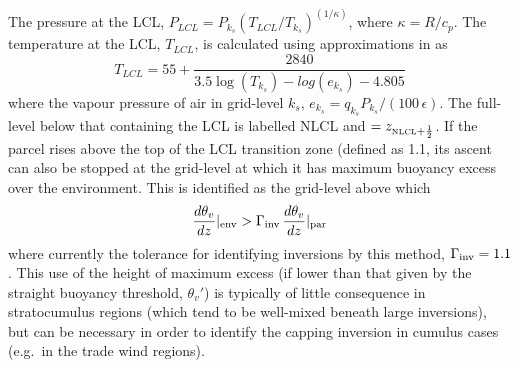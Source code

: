 \documentclass{UMDP_article}
\begin{document}
The pressure at the LCL, $P_{LCL}=P_{k_s}
(T_{LCL}/T_{k_s})^{(1/\kappa)}$, where $\kappa=R/c_p$.  The
temperature at the LCL, $T_{LCL}$, is calculated using approximations
in \cite{Bolton1980} as
\begin{equation*}
  T_{LCL} = 55 + \frac{2840}{3.5 \log(T_{k_s}) - log(e_{k_s}) - 4.805}
\end{equation*}
where the vapour pressure of air in grid-level $k_s$, $e_{k_s} =
q_{k_s} P_{k_s}/(100 \, \epsilon)$.  The full-level below that
containing the LCL is labelled NLCL and \zlcl$=z_{\mbox{\tiny \rm NLCL}+\frac{1}{2}}$.
If the parcel rises above the top of the LCL transition zone (defined
as 1.1\zlcl, its ascent can also be stopped at the grid-level at which
it has maximum buoyancy excess over the environment.  This is
identified as the grid-level above which
\begin{equation*}
  \frac{d\theta_v}{dz}|_{\rm env} > 
  \Gamma_{\rm inv}\, \frac{d\theta_v}{dz}|_{\rm par} 
\end{equation*}
where currently the tolerance for identifying inversions by this
method, $\Gamma_{\rm inv}=1.1$.  This use of the height of maximum
excess (if lower than that given by the straight buoyancy threshold,
$\theta_v'$) is typically of little consequence in stratocumulus
regions (which tend to be well-mixed beneath large inversions), but
can be necessary in order to identify the capping inversion in cumulus
cases (e.g.~in the trade wind regions).
\end{document}
